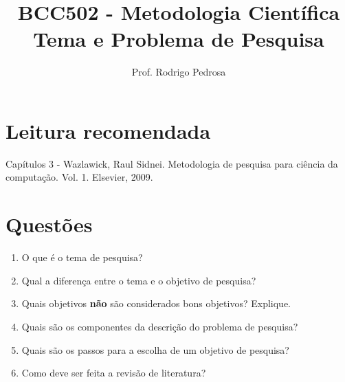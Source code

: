 \documentclass{article}
\title{BCC502 - Metodologia Científica\\
Tema e Problema de Pesquisa}
\author{Prof. Rodrigo Pedrosa}
\begin{document}
\maketitle

\section{Leitura recomendada}

Capítulos 3 - Wazlawick, Raul Sidnei. Metodologia de pesquisa para ciência da computação. Vol. 1. Elsevier, 2009.


\section{Questões}

\begin{enumerate}

    \item O que é o tema de pesquisa?
    \item Qual a diferença entre o tema e o objetivo de pesquisa?
    \item Quais objetivos \textbf{não} são considerados bons objetivos? Explique.
    \item Quais são os componentes da descrição do problema de pesquisa?
    \item Quais são os passos para a escolha de um objetivo de pesquisa?
    \item Como deve ser feita a revisão de literatura?
     
\end{enumerate}
    
%
%
\end{document}
